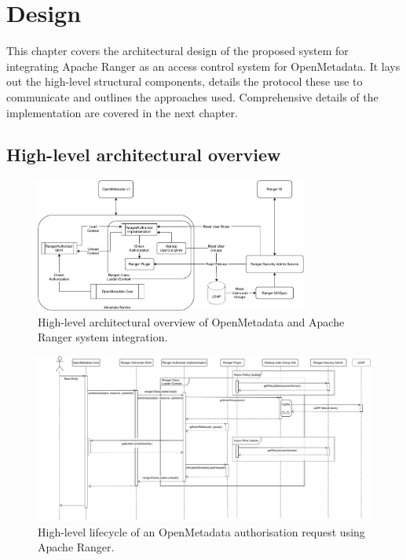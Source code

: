 \chapter{Design}

This chapter covers the architectural design of the proposed system for integrating Apache Ranger as an access control system for OpenMetadata. It lays out the high-level structural components, details the protocol these use to communicate and outlines the approaches used. Comprehensive details of the implementation are covered in the next chapter.

\section{High-level architectural overview}

\begin{figure}
    \centering
    \includegraphics[width=0.8\textwidth]{chapters/design/figures/openmetadata-ranger-arch.pdf}
    \caption{High-level architectural overview of OpenMetadata and Apache Ranger system integration.}
    \label{fig:openmetadata-ranger-arch}
\end{figure}

\begin{figure}
    \centering
    \includegraphics[width=\textwidth]{chapters/design/figures/openmetadata-ranger-lifecycle.pdf}
    \caption{High-level lifecycle of an  OpenMetadata authorisation request using Apache Ranger.}
    \label{fig:openmetadata-ranger-lifecycle}
\end{figure}

